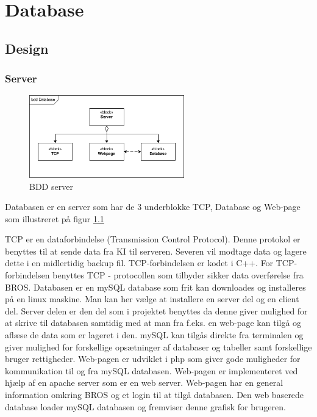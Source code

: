 \chapter{Database}
\section{Design}
\subsection{Server}
\begin{figure}[htbp]
	\centering
	\includegraphics[width=0.6\textwidth]{billeder/bdd_server}
	\caption{BDD server}
	\label{fig:bdd_server}
\end{figure}

Databasen er en server som har de 3 underblokke TCP, Database og Web-page som illustreret på figur \ref{fig:bdd_server}

TCP er en dataforbindelse (Transmission Control Protocol). Denne protokol er benyttes til at sende data fra KI til serveren. Severen vil modtage data og lagere dette i en midlertidig backup fil. TCP-forbindelsen er kodet i C++.
For TCP-forbindelsen benyttes TCP - protocollen som tilbyder sikker data overførelse fra BROS.
Databasen er en mySQL database som frit kan downloades og installeres på en linux maskine. Man kan her vælge at installere en server del og en client del. Server delen er den del som i projektet benyttes da denne giver mulighed for at skrive til databasen samtidig med at man fra f.eks. en web-page kan tilgå og aflæse de data som er lageret i den. mySQL kan tilgås direkte fra terminalen og giver mulighed for forskellige opsætninger af databaser og tabeller samt forskellige bruger rettigheder.
Web-pagen er udviklet i php som giver gode muligheder for kommunikation til og fra mySQL databasen. Web-pagen er implementeret ved hjælp af en apache server som er en web server. Web-pagen har en general information omkring BROS og et login til at tilgå databasen. Den web baserede database loader mySQL databasen og fremviser denne grafisk for brugeren.

